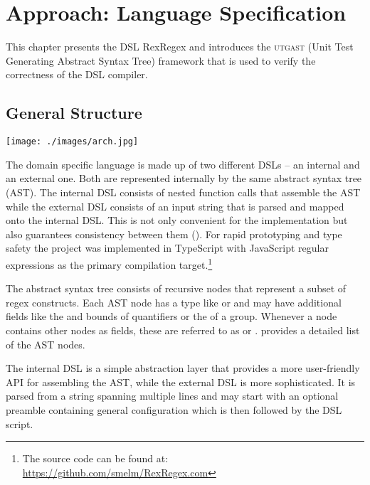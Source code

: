\chapter{Approach: Language Specification}

This chapter presents the DSL RexRegex and introduces the \textsc{utgast} (Unit Test Generating Abstract Syntax Tree) framework that is used to verify the correctness of the DSL compiler.

\section{General Structure}

\begin{boxFigure}[title={Stages of Compilation},label=fig:stagesOfCompilation]
\texttt{[image: ./images/arch.jpg]}
\end{boxFigure}

The domain specific language is made up of two different DSLs -- an internal and an external one. Both are represented internally by the same abstract syntax tree (AST). The internal DSL consists of nested function calls that assemble the AST while the external DSL consists of an input string that is parsed and mapped onto the internal DSL. This is not only convenient for the implementation but also guarantees consistency between them (). For rapid prototyping and type safety the project was implemented in TypeScript with JavaScript regular expressions as the primary compilation target.\footnote{The source code can be found at: \url{https://github.com/smelm/RexRegex.com}} 

The abstract syntax tree consists of recursive nodes that represent a subset of regex constructs. Each AST node has a type like  or  and may have additional fields like the  and  bounds of quantifiers or the  of a group. Whenever a node contains other nodes as fields, these are referred to as  or .  provides a detailed list of the AST nodes.

The internal DSL is a simple abstraction layer that provides a more user-friendly API for assembling the AST, while the external DSL is more sophisticated. It is parsed from a string spanning multiple lines and may start with an optional preamble containing general configuration which is then followed by the DSL script.

